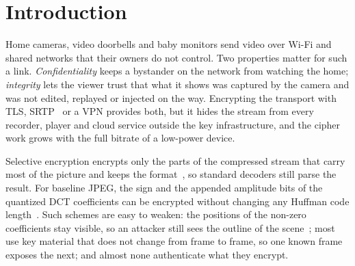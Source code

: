 \section{Introduction}\label{sec:intro}
Home cameras, video doorbells and baby monitors send video over Wi-Fi and shared networks that their owners do not control. Two properties matter for such a link. \emph{Confidentiality} keeps a bystander on the network from watching the home; \emph{integrity} lets the viewer trust that what it shows was captured by the camera and was not edited, replayed or injected on the way. Encrypting the transport with TLS, SRTP~\cite{rfc3711} or a VPN provides both, but it hides the stream from every recorder, player and cloud service outside the key infrastructure, and the cipher work grows with the full bitrate of a low-power device.

Selective encryption encrypts only the parts of the compressed stream that carry most of the picture and keeps the format~\cite{massoudi2008}, so standard decoders still parse the result. For baseline JPEG, the sign and the appended amplitude bits of the quantized DCT coefficients can be encrypted without changing any Huffman code length~\cite{vandroogenbroeck2002,auer2013}. Such schemes are easy to weaken: the positions of the non-zero coefficients stay visible, so an attacker still sees the outline of the scene~\cite{massoudi2008,lin2024,hirose2024}; most use key material that does not change from frame to frame, so one known frame exposes the next; and almost none authenticate what they encrypt.

